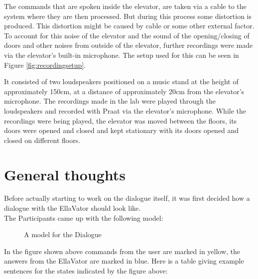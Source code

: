 \documentclass[a4paper, 12pt]{article}
\begin{document}
The commands that are spoken inside the elevator, are taken via a cable to the system where they are then processed. But during this process some distortion is produced. This distortion might be caused by cable or some other external factor. To account for this noise of the elevator and the sound of the opening/closing of doors and other noises from outside of the elevator, further recordings were made via the elevator's built-in microphone. The setup used for this can be seen in Figure \ref{fig:recordingsetup}.

It consisted of two loudspeakers positioned on a music stand at the height of approximately 150cm, at a distance of approximately 20cm from the elevator's microphone. 
The recordings made in the lab were played through the loudspeakers and recorded with Praat via the elevator's microphone. 
While the recordings were being played, the elevator was moved between the floors, its doors were opened and closed and kept stationary with its doors opened and closed on different floors.

\newpage
\section{General thoughts}
\label{sec:General_thoughts}
Before actually starting to work on the dialogue itself, it was first decided how a dialogue with the EllaVator should look like. \\

The Participants came up with the following model: \\


\begin{figure} [ht]
  \caption{A model for the Dialogue}
  \label{fig: Dialogue flow}
\end{figure}

In the figure shown above commands from the user are marked in yellow, the answers from the EllaVator are marked in blue.
Here is a table giving example sentences for the states indicated by the figure above: \\
\end{document}
